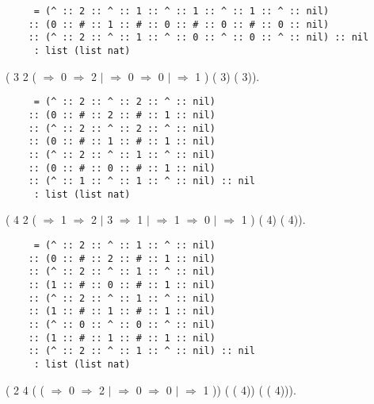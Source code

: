 \documentclass[12pt]{report}
\begin{document}
\begin{verbatim}
     = (^ :: 2 :: ^ :: 1 :: ^ :: 1 :: ^ :: 1 :: ^ :: nil)
    :: (0 :: # :: 1 :: # :: 0 :: # :: 0 :: # :: 0 :: nil)
    :: (^ :: 2 :: ^ :: 1 :: ^ :: 0 :: ^ :: 0 :: ^ :: nil) :: nil
     : list (list nat)
\end{verbatim}
  \begin{coqdoccode}
\coqdocemptyline
\coqdocnoindent
{} ( 3 2 (   \ensuremath{\Rightarrow}    0 \ensuremath{\Rightarrow} 2 \ensuremath{|} \coqdocvar{\_} \ensuremath{\Rightarrow}    0 \ensuremath{\Rightarrow} 0 \ensuremath{|} \coqdocvar{\_} \ensuremath{\Rightarrow} 1  ) ( 3) ( 3)).\coqdoceol
\end{coqdoccode}
 
\begin{verbatim}
     = (^ :: 2 :: ^ :: 2 :: ^ :: nil)
    :: (0 :: # :: 2 :: # :: 1 :: nil)
    :: (^ :: 2 :: ^ :: 2 :: ^ :: nil)
    :: (0 :: # :: 1 :: # :: 1 :: nil)
    :: (^ :: 2 :: ^ :: 1 :: ^ :: nil)
    :: (0 :: # :: 0 :: # :: 1 :: nil)
    :: (^ :: 1 :: ^ :: 1 :: ^ :: nil) :: nil
     : list (list nat)
\end{verbatim}
  \begin{coqdoccode}
\coqdocemptyline
\coqdocnoindent
{} ( 4 2 (   \ensuremath{\Rightarrow}    1 \ensuremath{\Rightarrow} 2 \ensuremath{|} 3 \ensuremath{\Rightarrow} 1 \ensuremath{|} \coqdocvar{\_} \ensuremath{\Rightarrow}    1 \ensuremath{\Rightarrow} 0 \ensuremath{|} \coqdocvar{\_} \ensuremath{\Rightarrow} 1  ) ( 4) ( 4)).\coqdoceol
\end{coqdoccode}
 
\begin{verbatim}
     = (^ :: 2 :: ^ :: 1 :: ^ :: nil)
    :: (0 :: # :: 2 :: # :: 1 :: nil)
    :: (^ :: 2 :: ^ :: 1 :: ^ :: nil)
    :: (1 :: # :: 0 :: # :: 1 :: nil)
    :: (^ :: 2 :: ^ :: 1 :: ^ :: nil)
    :: (1 :: # :: 1 :: # :: 1 :: nil)
    :: (^ :: 0 :: ^ :: 0 :: ^ :: nil)
    :: (1 :: # :: 1 :: # :: 1 :: nil)
    :: (^ :: 2 :: ^ :: 1 :: ^ :: nil) :: nil
     : list (list nat)
\end{verbatim}
  \begin{coqdoccode}
\coqdocemptyline
\coqdocnoindent
{} ( 2 4 ( (   \ensuremath{\Rightarrow}    0 \ensuremath{\Rightarrow} 2 \ensuremath{|} \coqdocvar{\_} \ensuremath{\Rightarrow}    0 \ensuremath{\Rightarrow} 0 \ensuremath{|} \coqdocvar{\_} \ensuremath{\Rightarrow} 1  )) ( ( 4)) ( ( 4))).\coqdoceol
\end{coqdoccode}
 
\end{document}

